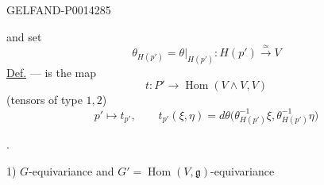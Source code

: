 \begin{GelfandAdjacentEvidence}{GELFAND-P001428}{5}


and set
\[
\theta_{H(p')}=\theta|_{H(p')}\colon H(p')\overset{\simeq}{\longrightarrow}V
\]
\uline{Def.}\quad {} — is the map
\[
t\colon P'\longrightarrow\operatorname{Hom}(V\wedge V,V)
\]
(tensors of type \(1,2\))
\[
p'\mapsto t_{p'},\qquad
t_{p'}(\xi,\eta)=d\theta\bigl(\theta_{H(p')}^{-1}\xi,\theta_{H(p')}^{-1}\eta\bigr)
\]
\end{GelfandAdjacentEvidence}


.

1) \(G\)-equivariance and \(G'=\operatorname{Hom}(V,\mathfrak g)\)-equivariance


